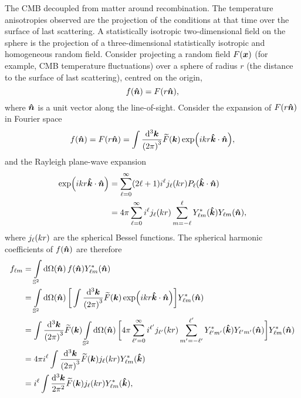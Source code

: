 The CMB decoupled from matter around recombination.
The temperature anisotropies observed are the projection of the conditions at that time over the surface of last scattering.
A statistically isotropic two-dimensional field on the sphere is the projection of a three-dimensional statistically isotropic and homogeneous random field.
Consider projecting a random field \(F(\vb*{x})\) (for example, CMB temperature fluctuations) over a sphere of radius \(r\) (the distance to the surface of last scattering), centred on the origin, \ie{}
%
\begin{equation}
	f(\vu*{n})
	= F(r\vu*{n}),
\end{equation}
%
where \(\vu*{n}\) is a unit vector along the line-of-sight.
Consider the expansion of \(F(r\vu*{n})\) in Fourier space
%
\begin{equation}
	f(\vu*{n})
	= F(r\vu*{n})
	= \int\frac{\dd[3]{\vb*{k}}}{{(2\pi)}^{3}} \fourier{F}(\vb*{k}) \exp(i k r\vu*{k}\cdot\vu*{n}),
\end{equation}
%
and the Rayleigh plane-wave expansion
%
\begin{align}
	\exp(i k r\vu*{k}\cdot\vu*{n})
	 & = \sum\limits_{\ell=0}^{\infty} (2\ell+1) i^{\ell} \bessel{k r} P_{\ell}(\vu*{k}\cdot\vu*{n}) \nonumber{}                                   \\
	 & = 4\pi \sum\limits_{\ell=0}^{\infty} i^{\ell} \bessel{k r} \sum\limits_{m=-\ell}^{\ell} \conj{\harmonic{Y}}(\vu*{k}) \harmonic{Y}(\vu*{n}),
\end{align}
%
where \(\bessel{k r}\) are the spherical Bessel functions.
The spherical harmonic coefficients of \(f(\vu*{n})\) are therefore
%
\begin{align}
	\harmonic{f}
	 & = \integrateSphere{\vu*{n}} f(\vu*{n}) \conj{\harmonic{Y}}(\vu*{n}) \nonumber{}                                                                                                                                                                                                                       \\
	 & = \integrateSphere{\vu*{n}} \bigg[\int\frac{\dd[3]{\vb*{k}}}{{(2\pi)}^{3}} \fourier{F}(\vb*{k}) \exp(i k r\vu*{k}\cdot\vu*{n})\bigg] \conj{\harmonic{Y}}(\vu*{n}) \nonumber{}                                                                                                                         \\
	 & = \int\frac{\dd[3]{\vb*{k}}}{{(2\pi)}^{3}} \fourier{F}(\vb*{k}) \integrateSphere{\vu*{n}} \bigg[4\pi \sum\limits_{\ell'=0}^{\infty} i^{\ell'} \bessel[']{k r} \sum\limits_{m'=-\ell'}^{\ell'} \conj{\harmonic[']{Y}}(\vu*{k}) \harmonic[']{Y}(\vu*{n})\bigg] \conj{\harmonic{Y}}(\vu*{n}) \nonumber{} \\
	 & = 4\pi i^{\ell} \int\frac{\dd[3]{\vb*{k}}}{{(2\pi)}^{3}} \fourier{F}(\vb*{k}) \bessel{k r} \conj{\harmonic{Y}}(\vu*{k}) \nonumber{}                                                                                                                                                                   \\
	 & = i^{\ell} \int\frac{\dd[3]{\vb*{k}}}{2\pi^{2}} \fourier{F}(\vb*{k}) \bessel{k r} \conj{\harmonic{Y}}(\vu*{k}),
\end{align}
